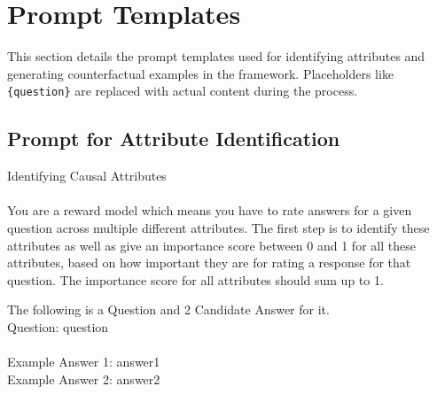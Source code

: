 \section{Prompt Templates}
\label{sec:prompt_templates}

This section details the prompt templates used for identifying attributes and generating counterfactual examples in the \carma{} framework. Placeholders like \texttt{\{question\}} are replaced with actual content during the process.


\subsection{Prompt for Attribute Identification}


\begin{promptbox}{Identifying Causal Attributes\\\\}
You are a reward model which means you have to rate answers for a given question across multiple different attributes.
The first step is to identify these attributes as well as give an importance score between 0 and 1 for all these attributes, based on how important they are for rating a response for that question.
The importance score for all attributes should sum up to 1.

The following is a Question and 2 Candidate Answer for it.\\

Question: {question}\\\\
Example Answer 1: {answer1}\\
Example Answer 2: {answer2}\\


\end{promptbox}
